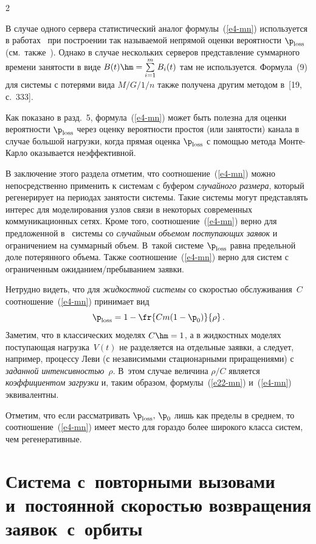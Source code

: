 \begin{multicols}{2}
\smallskip

В случае одного сервера  статистический аналог
формулы~(\ref{e4-mn}) используется   в работах~\cite{Whitt91, Whitt90} при
построении так называемой непрямой оценки вероятности $\p_{\mathrm{loss}}$ (см.\ также~\cite{GM}). 
Однако в случае нескольких серверов представление
 суммарного времени занятости в виде $B(t)\hm=\sum\limits_{i=1}^mB_i(t)$ там не используется.
 Формула~(9) для системы с потерями вида $M/G/1/n$ так\-же получена другим методом 
 в~[19, с.~333].

 Как показано  в разд.~5,  формула~(\ref{e4-mn})  может быть полезна для  оценки
 вероятности $\p_{\mathrm{loss}}$ через оценку вероятности простоя (или занятости)
 канала в случае большой нагрузки, когда прямая оценка $\p_{\mathrm{loss}}$ с помощью метода Мон\-те-Кар\-ло
оказывается неэффективной.

В заключение этого раздела отметим, что  соотношение~(\ref{e4-mn}) можно
непосредственно применить к системам с буфером {\it случайного размера},
который  регенерирует на периодах занятости сис\-те\-мы. Такие сис\-те\-мы могут
представлять интерес для моделирования  узлов связи в некоторых современных
коммуникационных сетях. Кроме того, соотношение~(\ref{e4-mn}) верно  для предложенной 
в~\cite{Tih} системы со {\it случайным объемом поступающих заявок} и ограничением
на  суммарный объем. В~такой  системе  $\p_{\mathrm{loss}}$   равна предельной доле
потерянного объема. Также соотношение~(\ref{e4-mn}) верно для систем с ограниченным
ожиданием/пребыванием заявки.

Нетрудно видеть, что  для {\it жидкостной системы} со скоростью обслуживания~$C$  
соотношение~(\ref{e4-mn}) принимает вид 
\begin{equation} 
\p_{\mathrm{loss}}=1-\fr{Cm (1-\p_0)}{\rho}\,.
\label{e22-mn} 
\end{equation} 
Заметим, что в классических моделях $C\hm=1$, а  в жидкостных моделях поступающая 
нагрузка~$V(t)$ не разделяется на отдельные заявки, а следует, например,  
процессу Леви (с независимыми стационарными приращениями) с {\it заданной интенсивностью}~$\rho$. 
В~этом случае величина $\rho/C$  является {\it коэффициентом загрузки} и, таким
образом, формулы~(\ref{e22-mn}) и~(\ref{e4-mn}) эквивалентны. 

Отметим, что если рассматривать $\p_{\mathrm{loss}},\,\p_0$ лишь как пределы в среднем,
то соотношение~(\ref{e4-mn}) имеет место   для гораздо более широкого класса
сис\-тем, чем регенеративные.

\section{Система с~повторными вызовами и~постоянной скоростью возвращения
заявок~с~орбиты}


\end{multicols}
